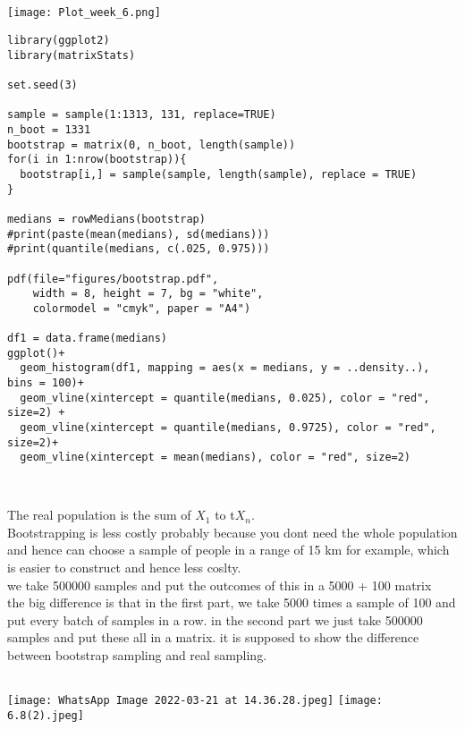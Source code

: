 \documentclass{article}
\begin{document}
\subsection{}
\texttt{[image: Plot\_week\_6.png]}

\begin{verbatim}
library(ggplot2)
library(matrixStats)

set.seed(3)

sample = sample(1:1313, 131, replace=TRUE)
n_boot = 1331
bootstrap = matrix(0, n_boot, length(sample))
for(i in 1:nrow(bootstrap)){
  bootstrap[i,] = sample(sample, length(sample), replace = TRUE)
}

medians = rowMedians(bootstrap)
#print(paste(mean(medians), sd(medians)))
#print(quantile(medians, c(.025, 0.975)))

pdf(file="figures/bootstrap.pdf",
    width = 8, height = 7, bg = "white",
    colormodel = "cmyk", paper = "A4")

df1 = data.frame(medians)
ggplot()+
  geom_histogram(df1, mapping = aes(x = medians, y = ..density..), bins = 100)+
  geom_vline(xintercept = quantile(medians, 0.025), color = "red", size=2) +
  geom_vline(xintercept = quantile(medians, 0.9725), color = "red", size=2)+
  geom_vline(xintercept = mean(medians), color = "red", size=2)


\end{verbatim}

\subsection{}
The real population is the sum of $X_1$ to t$X_n$.\\
Bootstrapping is less costly probably because you dont need the whole population and hence can choose a sample of people in a range of 15 km for example, which is easier to construct and hence less coslty.\\
we take 500000 samples and put the outcomes of this in a 5000 + 100 matrix\\
the big difference is that in the first part, we take 5000 times a sample of 100 and put every batch of samples in a row. in the second part we just take 500000 samples and put these all in a matrix. it is supposed to show the difference between bootstrap sampling and real sampling. 

\subsection{} %
\texttt{[image: WhatsApp Image 2022-03-21 at 14.36.28.jpeg]}
\newpage
\texttt{[image: 6.8(2).jpeg]}\\
\end{document}
